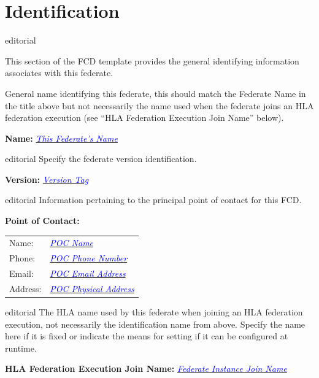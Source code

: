 \documentclass[11pt,english,letterpaper]{article}
\newcommand{\example}[1]{{\textcolor{blue}{\textit{#1}}}}
\begin{document}
\section*{Identification}

\begin{shownto}{editorial}
{\color{red} This section of the FCD template provides the general identifying
information associates with this federate.

General name identifying this federate, this should match the
\textlangle{}Federate Name\textrangle{} in the title above but not necessarily
the name used when the federate joins an HLA federation execution (see ``HLA
Federation Execution Join Name'' below).}
\end{shownto}

\textbf{Name: } \underline{\example{This Federate's Name}}

\begin{shownto}{editorial}
{\color{red} Specify the federate version identification.}
\end{shownto}

\textbf{Version: } \underline{\example{Version Tag}}

\begin{shownto}{editorial}
{\color{red} Information pertaining to the principal point of contact for
this FCD.}
\end{shownto}

\textbf{Point of Contact: }

\hspace{0.25in}
\begin{tabularx}{\textwidth}{lX}
Name:    & \underline{\example{POC Name}} \\
Phone:   & \underline{\example{POC Phone Number}} \\
Email:   & \underline{\example{POC Email Address}} \\
Address: & \underline{\example{POC Physical Address}}
\end{tabularx}

\begin{shownto}{editorial}
{\color{red} The HLA name used by this federate when joining an HLA federation
execution, not necessarily the identification name from above. Specify the
name here if it is fixed or indicate the means for setting if it can be
configured at runtime.}
\end{shownto}

\textbf{HLA Federation Execution Join Name: } \underline{\example{Federate Instance Join Name}}
\end{document}
